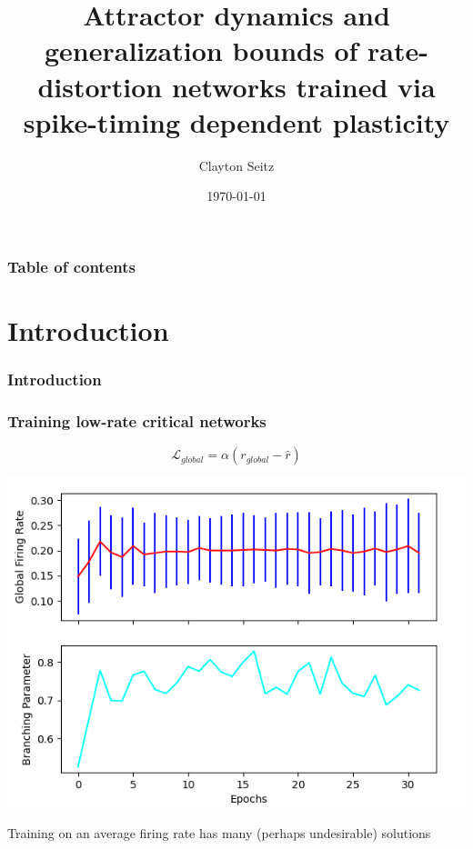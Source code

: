 \documentclass{beamer}
\begin{document}
\title{Attractor dynamics and generalization bounds of rate-distortion networks trained via spike-timing dependent plasticity}  
\author{Clayton Seitz}
\date{\today} 

\begin{frame}[plain]
\titlepage
\end{frame}

\begin{frame}[plain]\frametitle{Table of contents}\tableofcontents
\end{frame} 

\section{Introduction} 

\begin{frame}[plain]
\frametitle{Introduction} 

\end{frame}

\begin{frame}[plain]
\frametitle{Training low-rate critical networks} 

\begin{equation*}
\mathcal{L}_{global} = \alpha(r_{global} - \hat{r})
\end{equation*}

\begin{center}
\includegraphics[scale=0.5]{global-rate-vars}
\end{center}

Training on an average firing rate has many (perhaps undesirable) solutions

\end{frame}
\end{document}
